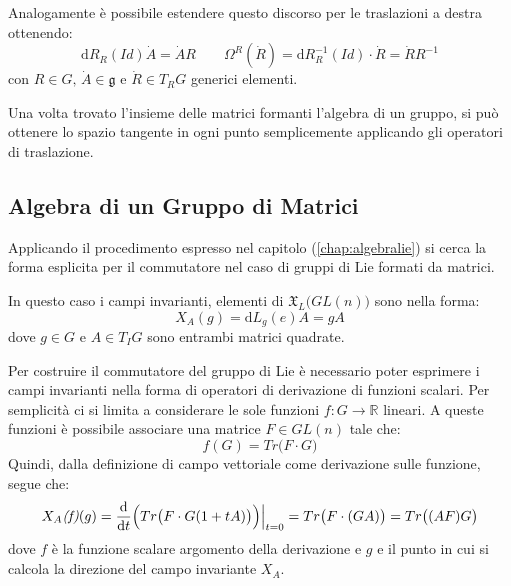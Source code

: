\documentclass[11pt]{report}
\theoremstyle{plain}
\theoremstyle{definition}
\theoremstyle{remark}
\begin{document}
Analogamente è possibile estendere questo discorso per le traslazioni a destra ottenendo:
	\begin{equation}\label{eq:maurercartandestramatrici}
\textrm{d}R_{R}(Id) \dot{A} = \dot{A}R \qquad \Omega^{R}(\dot{R}) = \textrm{d}R_{R}^{-1}(Id) \cdot \dot{R} = \dot{R} R^{-1} 
	\end{equation}
con $R \in G, \, \dot{A}\in \mathfrak{g}$ e $\dot{R}\in T_{R}G$ generici elementi.

Una volta trovato l'insieme delle matrici formanti l'algebra di un gruppo, si può ottenere lo spazio tangente in ogni punto semplicemente applicando gli operatori di traslazione.	



\subsection{Algebra di un Gruppo di Matrici}
Applicando il procedimento espresso nel capitolo (\ref{chap:algebralie}) si cerca la forma esplicita per il commutatore nel caso di gruppi di Lie formati da matrici.

In questo caso i campi invarianti, elementi di $\mathfrak{X}_{L}\Bigr(GL(n)\Bigr)$ sono nella forma:
$$X_{A}(g) = \textrm{d}L_{g}(e) A = gA$$
dove $g \in G$ e $A \in T_{I}G$ sono entrambi matrici quadrate.

Per costruire il commutatore del gruppo di Lie è necessario poter esprimere i campi invarianti nella forma di operatori di derivazione di funzioni scalari.
Per semplicità ci si limita a considerare le sole funzioni $f:G \rightarrow \mathbb{R}$ lineari. A queste funzioni è possibile associare una matrice $F \in GL(n)$ tale che:
	\begin{displaymath}
f(G) = Tr \Bigr( F \cdot G \Bigr)
	\end{displaymath}
Quindi, dalla definizione di campo vettoriale come derivazione sulle funzione, segue che:
	\begin{displaymath}
X_{A}\emph{(f)}(g) = \dfrac{\textrm{d} }{\textrm{d}t} \Bigr(Tr \bigr(F\cdot G( 1 + tA) \bigr) \Bigr) \Bigr|_{t=0} = Tr \bigr(F\cdot( G A) \bigr) = Tr\bigr((AF)G \bigr) 
	\end{displaymath}
dove $f$ è la funzione scalare argomento della derivazione e $g$ e il punto in cui si calcola la direzione del campo invariante $X_{A}$.
\end{document}
